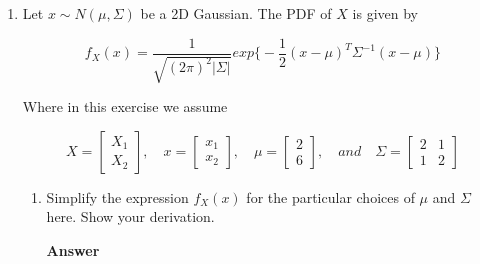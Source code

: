 \documentclass[11pt]{article}
\begin{document}
\begin{enumerate}[label=(\alph*)]
\item Let $x \sim N(\mu, \Sigma)$ be a 2D Gaussian. The PDF of $X$ is given by 

\begin{equation}
f_X(x) = \frac{1}{\sqrt{(2\pi)^2|\Sigma|}}exp \Big\{ -\frac{1}{2} (x-\mu)^T \Sigma^{-1} (x-\mu)\Big\}
\end{equation}

Where in this exercise we assume

\begin{equation}
X = 
\begin{bmatrix}
X_1\\
X_2
\end{bmatrix}
, \quad x = 
\begin{bmatrix}
x_1\\
x_2
\end{bmatrix}
, \quad \mu =
\begin{bmatrix}
2\\
6
\end{bmatrix}
, \quad  and \quad \Sigma = 
\begin{bmatrix}
2 & 1\\
1 & 2
\end{bmatrix}
\end{equation}

\begin{enumerate}[label=(\roman*)]
\item Simplify the expression $f_X(x)$ for the particular choices of $\mu$ and $\Sigma$ here. Show your derivation.

\noindent\textbf{Answer}


\end{enumerate}
\end{enumerate}
\end{document}
